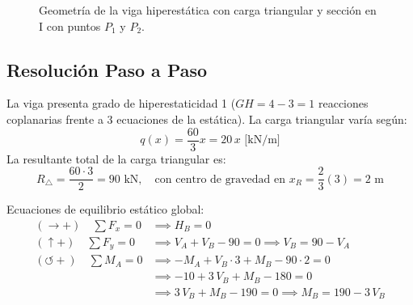 \begin{figure}[H]
{%
    }
    \caption{Geometría de la viga hiperestática con carga triangular y sección en I con puntos $P_1$ y $P_2$.}
    \label{fig:examen_viga_triangular_geometria}
\end{figure}

\subsection{Resolución Paso a Paso}


La viga presenta grado de hiperestaticidad 1 ($GH = 4 - 3 = 1$ reacciones coplanarias frente a 3 ecuaciones de la estática).
La carga triangular varía según:
\begin{equation}
    q(x) = \frac{60}{3}x = 20\,x\text{ [kN/m]}
\end{equation}
La resultante total de la carga triangular es:
\begin{equation}
    R_{\triangle} = \frac{60 \cdot 3}{2} = 90\text{ kN}, \quad \text{con centro de gravedad en } x_R = \frac{2}{3}(3) = 2\text{ m}
\end{equation}

Ecuaciones de equilibrio estático global:
\begin{align}
    (\rightarrow +) \quad \sum F_x = 0 & \implies \boxed{H_B = 0} \\[6pt]
    (\uparrow +) \quad \sum F_y = 0    & \implies V_A + V_B - 90 = 0 \implies \boxed{V_B = 90 - V_A} \label{eq:triang_fy} \\[6pt]
    (\circlearrowleft +) \quad \sum M_A = 0 & \implies -M_A + V_B \cdot 3 + M_B - 90 \cdot 2 = 0 \nonumber \\
                                           & \implies -10 + 3\,V_B + M_B - 180 = 0 \nonumber \\
                                           & \implies 3\,V_B + M_B - 190 = 0 \implies \boxed{M_B = 190 - 3\,V_B} \label{eq:triang_ma}
\end{align}

